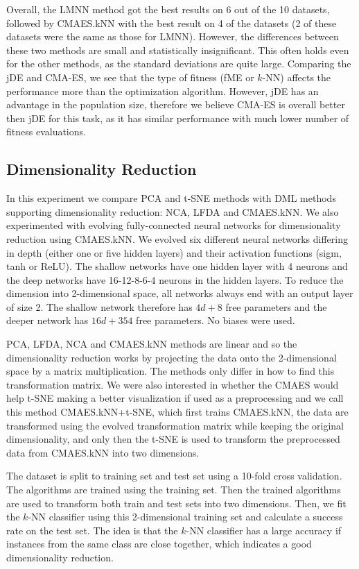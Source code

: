 Overall, the LMNN method got the best results on 6 out of the 10 datasets, followed by CMAES.kNN with the best result on 4 of the datasets (2 of these datasets were the same as those for LMNN). However, the differences between these two methods are small and statistically insignificant. This often holds even for the other methods, as the standard deviations are quite large. Comparing the jDE and CMA-ES, we see that the type of fitness (fME or $k$-NN) affects the performance more than the optimization algorithm. However, jDE has an advantage in the population size, therefore we believe CMA-ES is overall better then jDE for this task, as it has similar performance with much lower number of fitness evaluations.

\subsection{Dimensionality Reduction}
\label{chap:exp:dimred}

In this experiment we compare PCA and t-SNE methods with DML methods supporting dimensionality reduction: NCA, LFDA and CMAES.kNN. We also experimented with evolving fully-connected neural networks for dimensionality reduction using CMAES.kNN. We evolved six different neural networks differing in depth (either one or five hidden layers) and their activation functions (sigm, tanh or ReLU). The shallow networks have one hidden layer with 4 neurons and the deep networks have 16-12-8-6-4 neurons in the hidden layers. To reduce the dimension into 2-dimensional space, all networks always end with an output layer of size 2. The shallow network therefore has $4d+8$ free parameters and the deeper network has $16d+354$ free parameters. No biases were used.

PCA, LFDA, NCA and CMAES.kNN methods are linear and so the dimensionality reduction works by projecting the data onto the 2-dimensional space by a matrix multiplication. The methods only differ in how to find this transformation matrix. We were also interested in whether the CMAES would help t-SNE making a better visualization if used as a preprocessing and we call this method CMAES.kNN+t-SNE, which first trains CMAES.kNN, the data are transformed using the evolved transformation matrix while keeping the original dimensionality, and only then the t-SNE is used to transform the preprocessed data from CMAES.kNN into two dimensions.

The dataset is split to training set and test set using a 10-fold cross validation. The algorithms are trained using the training set. Then the trained algorithms are used to transform both train and test sets into two dimensions. Then, we fit the $k$-NN classifier using this 2-dimensional training set and calculate a success rate on the test set. The idea is that the $k$-NN classifier has a large accuracy if instances from the same class are close together, which indicates a good dimensionality reduction.

